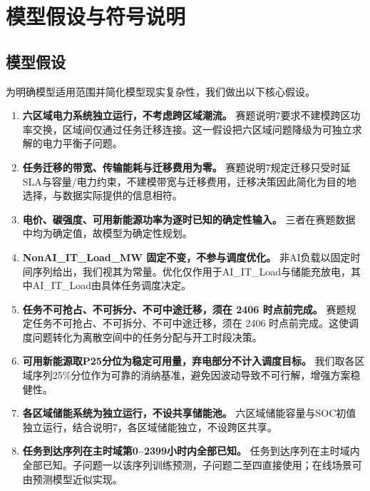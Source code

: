 \section{模型假设与符号说明}

\subsection{模型假设}

为明确模型适用范围并简化模型现实复杂性，我们做出以下核心假设。

\begin{enumerate}[label=假设\arabic*., leftmargin=*]
    \sloppy
    \item \textbf{六区域电力系统独立运行，不考虑跨区域潮流。}
    赛题说明7要求不建模跨区功率交换，区域间仅通过任务迁移连接。这一假设把六区域问题降级为可独立求解的电力平衡子问题。

    \item \textbf{任务迁移的带宽、传输能耗与迁移费用为零。}
    赛题说明7规定迁移只受时延SLA与容量/电力约束，不建模带宽与迁移费用，迁移决策因此简化为目的地选择，与数据实际提供的信息相符。

    \item \textbf{电价、碳强度、可用新能源功率为逐时已知的确定性输入。}
    三者在赛题数据中均为确定值，故模型为确定性规划。

    \item \textbf{NonAI\_IT\_Load\_MW 固定不变，不参与调度优化。}
    非AI负载以固定时间序列给出，我们视其为常量。优化仅作用于AI\_IT\_Load与储能充放电，其中AI\_IT\_Load由具体任务调度决定。

    \item \textbf{任务不可抢占、不可拆分、不可中途迁移，须在 2406 时点前完成。}
    赛题规定任务不可抢占、不可拆分、不可中途迁移，须在 2406 时点前完成。这使调度问题转化为离散空间中的任务分配与开工时段决策。

    \item \textbf{可用新能源取P25分位为稳定可用量，弃电部分不计入调度目标。}
    我们取各区域序列25\%分位作为可靠的消纳基准，避免因波动导致不可行解，增强方案稳健性。

    \item \textbf{各区域储能系统为独立运行，不设共享储能池。}
    六区域储能容量与SOC初值独立运行，结合说明7，各区域储能独立，不设跨区共享。

    \item \textbf{任务到达序列在主时域第0--2399小时内全部已知。}
    任务到达序列在主时域内全部已知。子问题一以该序列训练预测，子问题二至四直接使用；在线场景可由预测模型近似实现。
\end{enumerate}

